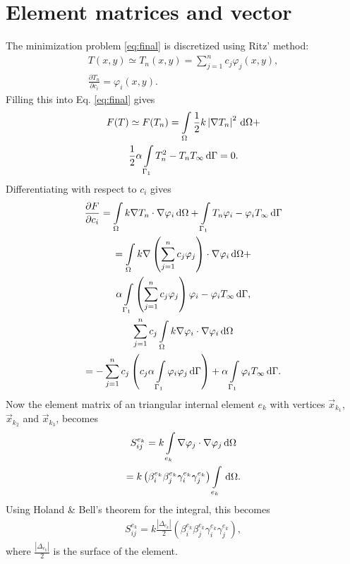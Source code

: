 \section{Element matrices and vector}\label{sec:elem}
The minimization problem \ref{eq:final} is discretized using Ritz' method:
\begin{gather*}
    T(x,y) \simeq T_n(x,y)=\sum_{j=1}^n c_j\varphi_j(x,y),\\
    \frac{\partial T_n}{\partial c_i}=\varphi_i(x,y).
\end{gather*} Filling this into Eq. \ref{eq:final} gives
\begin{gather*}
    F(T)\simeq F(T_n) = \int\displaylimits_{\Omega}\frac{1}{2} k \left|\nabla T_n\right|^2 \,\mathrm{d}\Omega + \\ \frac{1}{2}\alpha\int\displaylimits_{\Gamma_1}T_n^2-T_nT_{\infty} \,\mathrm{d}\Gamma = 0.
\end{gather*} Differentiating with respect to $c_i$ gives
\begin{gather*}
    \frac{\partial F}{\partial c_i} = \int\displaylimits_{\Omega}k\nabla T_n\cdot\nabla\varphi_i \,\mathrm{d}\Omega    +\int\displaylimits_{\Gamma_1}T_n\varphi_i-\varphi_iT_{\infty} \,\mathrm{d}\Gamma\\
    = \int\displaylimits_{\Omega}k\nabla\left(\sum_{j=1}^n c_j \varphi_j\right)\cdot \nabla \varphi_i \,\mathrm{d}\Omega + \\ \alpha\int\displaylimits_{\Gamma_1} \left(\sum_{j=1}^n c_j \varphi_j\right)\varphi_i - \varphi_i T_{\infty} \,\mathrm{d}\Gamma,\\
    \sum_{j=1}^n c_j \int\displaylimits_{\Omega}k\nabla\varphi_i\cdot \nabla \varphi_i \,\mathrm{d}\Omega \\
    = - \sum_{j=1}^n c_j\left(c_j\alpha\int\displaylimits_{\Gamma_1} \varphi_i \varphi_j \,\mathrm{d}\Gamma \right)+\alpha\int\displaylimits_{\Gamma_1}\varphi_i T_{\infty} \,\mathrm{d}\Gamma.
\end{gather*} Now the element matrix of an triangular internal element $e_k$ with vertices $\vec{x}_{k_1}$, $\vec{x}_{k_2}$ and $\vec{x}_{k_3}$, becomes
\begin{gather*}
    S_{ij}^{e_k} =  k\int\displaylimits_{e_k} \nabla \varphi_j \cdot \nabla \varphi_j \,\mathrm{d}\Omega \\
    = k\left(\beta_i^{e_k} \beta_j^{e_k} \gamma_i^{e_k} \gamma_j^{e_k} \right)\int\displaylimits_{e_k} \,\mathrm{d}\Omega.
\end{gather*} Using Holand \& Bell's theorem for the integral, this becomes
\begin{gather}
    S_{ij}^{e_k} = k \frac{|\Delta_{e_k}|}{2}\left(\beta_i^{e_k} \beta_j^{e_k} \gamma_i^{e_k} \gamma_j^{e_k} \right),
\end{gather} where $\frac{|\Delta_{e_k}|}{2}$ is the surface of the element.

